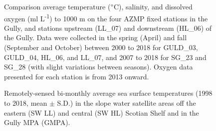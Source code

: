 \documentclass[12pt]{article}\usepackage[]{graphicx}\usepackage[]{color}
\begin{document}
\begin{landscapepage}
\begin{figure}[htb]

{\centering {} 

}

\caption{Comparison average temperature (\(\degree\)C), salinity, and dissolved oxygen (ml L\textsuperscript{-1}) to 1000 m on the four AZMP fixed stations in the Gully, and stations upstream (LL\_07) and downstream (HL\_06) of the Gully. Data were collected in the spring (April) and fall (September and October) between 2000 to 2018 for GULD\_03, GULD\_04, HL\_06, and LL\_07, and 2007 to 2018 for SG\_23 and SG\_28 (with slight variations between seasons). Oxygen data presented for each station is from 2013 onward.}\label{fig:figure13}
\end{figure}
\end{landscapepage}
\clearpage


\begin{figure}[htb]

{\centering {} 

}

\caption{Remotely-sensed bi-monthly average sea surface temperatures (1998 to 2018, mean \(\pm\) S.D.) in the slope water satellite areas off the eastern (SW LL) and central (SW HL) Scotian Shelf and in the Gully MPA (GMPA).}\label{fig:figure14}
\end{figure}
\clearpage
\end{document}

